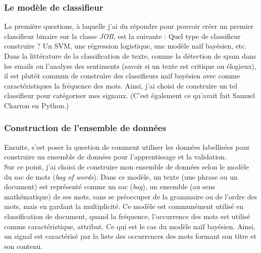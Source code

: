             \subsubsection{Le modèle de classifieur}
                La première questions, à laquelle j'ai du répondre pour pouvoir créer un premier classifieur binaire sur la classe \textit{JOB}, est la suivante : Quel type de classifieur construire ? Un SVM, une régression logistique, une modèle naïf bayésien, etc.\\
                Dans la littérature de la classification de texte, comme la détection de spam dans les emails ou l'analyse des sentiments (savoir si un texte est critique ou élogieux), il est plutôt commun de construire des classifieurs naïf bayésien avec comme caractéristiques la fréquence des mots. Ainsi, j'ai choisi de construire un tel classifieur pour catégoriser mes signaux. (C'est également ce qu'avait fait Samuel Charron en Python.)

            \subsubsection{Construction de l'ensemble de données}
                Ensuite, s'est poser la question de comment utiliser les données labellisées pour construire un ensemble de données pour l'apprentissage et la validation.\\
                Sur ce point, j'ai choisi de construire mon ensemble de données selon le modèle du sac de mots (\textit{bag of words}). Dans ce modèle, un texte (une phrase ou un document) est représenté comme un sac (\textit{bag}), un ensemble (au sens mathématique) de ses mots, sans se préoccuper de la grammaire ou de l'ordre des mots, mais en gardant la multiplicité. Ce modèle est communément utilisé en classification de document, quand la fréquence, l’occurrence des mots est utilisé comme caractéristique, attribut. Ce qui est le cas du modèle naïf bayésien. Ainsi, un signal est caractérisé par la liste des occurrences des mots formant son titre et son contenu.

